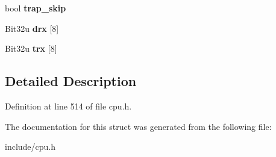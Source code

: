 \begin{DoxyCompactItemize}
\item 
\hypertarget{structCPUBlock_ad260beedb05a65ac8494b9d8f38010c2}{bool {\bfseries trap\-\_\-skip}}\label{structCPUBlock_ad260beedb05a65ac8494b9d8f38010c2}

\item 
\hypertarget{structCPUBlock_a58abd61bc639fbb9992d8715bb3ed6ac}{Bit32u {\bfseries drx} \mbox{[}8\mbox{]}}\label{structCPUBlock_a58abd61bc639fbb9992d8715bb3ed6ac}

\item 
\hypertarget{structCPUBlock_a8dacafb431cbcd0b7632b92f1999244a}{Bit32u {\bfseries trx} \mbox{[}8\mbox{]}}\label{structCPUBlock_a8dacafb431cbcd0b7632b92f1999244a}

\end{DoxyCompactItemize}


\subsection{Detailed Description}


Definition at line 514 of file cpu.\-h.



The documentation for this struct was generated from the following file\-:\begin{DoxyCompactItemize}
\item 
include/cpu.\-h\end{DoxyCompactItemize}
